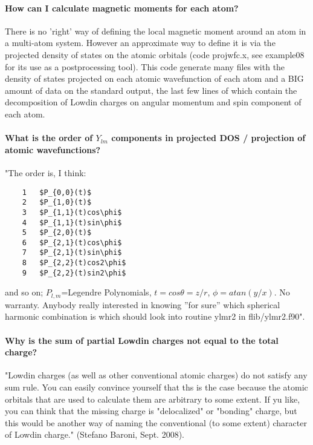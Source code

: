 \documentclass[12pt,a4paper]{article}
\begin{document}
\paragraph{How can I calculate magnetic moments for each atom?} 

There is no 'right' way of defining the local magnetic moment
around an atom in a multi-atom system. However an approximate way to define
it is via the projected density of states on the atomic orbitals (code
projwfc.x, see example08 for its use as a postprocessing tool). This
code generate many files with the density of states projected on each
atomic wavefunction of each atom and a BIG amount of data on the
standard output, the last few lines of which contain the decomposition
of Lowdin charges on angular momentum and spin component of each atom.

\paragraph{What is the order of $Y_{lm}$ components in projected
  DOS / projection of atomic wavefunctions?}

"The order is, I think:
\begin{verbatim}
    1   $P_{0,0}(t)$
    2   $P_{1,0}(t)$
    3   $P_{1,1}(t)cos\phi$
    4   $P_{1,1}(t)sin\phi$ 
    5   $P_{2,0}(t)$
    6   $P_{2,1}(t)cos\phi$ 
    7   $P_{2,1}(t)sin\phi$
    8   $P_{2,2}(t)cos2\phi$
    9   $P_{2,2}(t)sin2\phi$
\end{verbatim}
and so on; $P_{l,m}$=Legendre Polynomials, $t = cos\theta = z/r$, 
$\phi= atan(y /x)$. No warranty. Anybody really interested in knowing 
''for sure'' which spherical harmonic combination is which should look 
into routine ylmr2 in flib/ylmr2.f90". 

\paragraph{Why is the sum of partial Lowdin charges not equal to
  the total charge?} 

"Lowdin charges (as well as other conventional atomic charges) do not
satisfy any sum rule. You can easily convince yourself that ths is the
case because the atomic orbitals that are used to calculate them are
arbitrary to some extent. If yu like, you can think that the missing
charge is "delocalized" or "bonding" charge, but this would be another
way of naming the conventional (to some extent) character of Lowdin
charge." (Stefano Baroni, Sept. 2008).  
\end{document}

